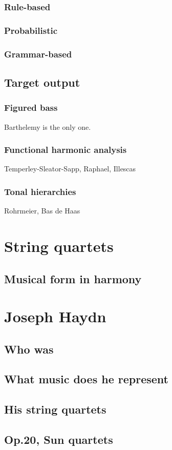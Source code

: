     \subsubsection{Rule-based}
    \subsubsection{Probabilistic}
    \subsubsection{Grammar-based}
  \subsection{Target output}
    \subsubsection{Figured bass}
    Barthelemy is the only one.
    \subsubsection{Functional harmonic analysis}
    Temperley-Sleator-Sapp, Raphael, Illescas
    \subsubsection{Tonal hierarchies}
    Rohrmeier, Bas de Haas
\section{String quartets}
  \subsection{Musical form in harmony}
\section{Joseph Haydn}
  \subsection{Who was}
  \subsection{What music does he represent}
  \subsection{His string quartets}
  \subsection{Op.20, Sun quartets}

\newpage
